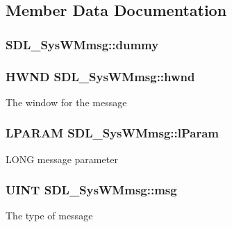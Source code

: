 \subsection{Member Data Documentation}
\subsubsection[{\texorpdfstring{dummy}{dummy}}]{ S\+D\+L\+\_\+\+Sys\+W\+Mmsg\+::dummy}\hypertarget{struct_s_d_l___sys_w_mmsg_a8faf13f90f2477157b42b631308cd900}{}\label{struct_s_d_l___sys_w_mmsg_a8faf13f90f2477157b42b631308cd900}
\subsubsection[{\texorpdfstring{hwnd}{hwnd}}]{\setlength{\rightskip}{0pt plus 5cm}H\+W\+ND S\+D\+L\+\_\+\+Sys\+W\+Mmsg\+::hwnd}\hypertarget{struct_s_d_l___sys_w_mmsg_a55cf9583b5eddfe60a5c9851f9cce457}{}\label{struct_s_d_l___sys_w_mmsg_a55cf9583b5eddfe60a5c9851f9cce457}
The window for the message 
\subsubsection[{\texorpdfstring{l\+Param}{lParam}}]{\setlength{\rightskip}{0pt plus 5cm}L\+P\+A\+R\+AM S\+D\+L\+\_\+\+Sys\+W\+Mmsg\+::l\+Param}\hypertarget{struct_s_d_l___sys_w_mmsg_a24c1e4c3cb8d9781d34e5d99df66ac36}{}\label{struct_s_d_l___sys_w_mmsg_a24c1e4c3cb8d9781d34e5d99df66ac36}
L\+O\+NG message parameter 
\subsubsection[{\texorpdfstring{msg}{msg}}]{\setlength{\rightskip}{0pt plus 5cm}U\+I\+NT S\+D\+L\+\_\+\+Sys\+W\+Mmsg\+::msg}\hypertarget{struct_s_d_l___sys_w_mmsg_a74894ed060d5508ab06aac584154d61e}{}\label{struct_s_d_l___sys_w_mmsg_a74894ed060d5508ab06aac584154d61e}
The type of message 
